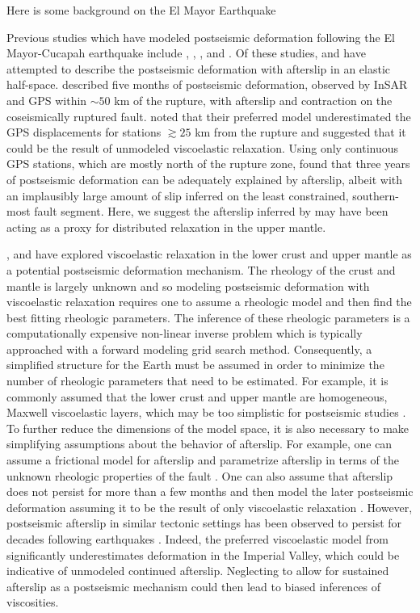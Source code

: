 \documentclass[draft,linenumbers]{AGUJournal}
\begin{document}
Here is some background on the El Mayor Earthquake


Previous studies which have modeled postseismic deformation following the El Mayor-Cucapah earthquake include \citet{Pollitz2012}, \citet{Gonzalez-ortega2014}, \citet{Spinler2015}, and \citet{Rollins2015}. Of these studies, \citet{Gonzalez-ortega2014} and \citet{Rollins2015} have attempted to describe the postseismic deformation with afterslip in an elastic half-space.  \citet{Gonzalez-ortega2014} described five months of postseismic deformation, observed by InSAR and GPS within ${\sim}50$ km of the rupture, with afterslip and contraction on the coseismically ruptured fault. \citet{Gonzalez-ortega2014} noted that their preferred model underestimated the GPS displacements for stations $\gtrsim 25$ km from the rupture and suggested that it could be the result of unmodeled viscoelastic relaxation.  Using only continuous GPS stations, which are mostly north of the rupture zone, \citet{Rollins2015} found that three years of postseismic deformation can be adequately explained by afterslip, albeit with an implausibly large amount of slip inferred on the least constrained, southern-most fault segment. Here, we suggest the afterslip inferred by \citet{Rollins2015} may have been acting as a proxy for distributed relaxation in the upper mantle. 

\citet{Pollitz2012}, \citet{Rollins2015} and \citet{Spinler2015} have explored viscoelastic relaxation in the lower crust and upper mantle as a potential postseismic deformation mechanism. The rheology of the crust and mantle is largely unknown and so modeling postseismic deformation with viscoelastic relaxation requires one to assume a rheologic model and then find the best fitting rheologic parameters.  The inference of these rheologic parameters is a computationally expensive non-linear inverse problem which is typically approached with a forward modeling grid search method.  Consequently, a simplified structure for the Earth must be assumed in order to minimize the number of rheologic parameters that need to be estimated.  For example, it is commonly assumed that the lower crust and upper mantle are homogeneous, Maxwell viscoelastic layers, which may be too simplistic for postseismic studies  \citep{Riva2009,Hines2013}. To further reduce the dimensions of the model space, it is also necessary to make simplifying assumptions about the behavior of afterslip. For example, one can assume a frictional model for afterslip and parametrize afterslip in terms of the unknown rheologic properties of the fault \citep[e.g.][]{Johnson2009,Johnson2004}. One can also assume that afterslip does not persist for more than a few months and then model the later postseismic deformation assuming it to be the result of only viscoelastic relaxation \citep[e.g.][]{Pollitz2012,Spinler2015}. However, postseismic afterslip in similar tectonic settings has been observed to persist for decades following earthquakes \citep{Cakir2012,Cetin2014}. Indeed, the preferred viscoelastic model from \citet{Pollitz2012} significantly underestimates deformation in the Imperial Valley, which could be indicative of unmodeled continued afterslip.  Neglecting to allow for sustained afterslip as a postseismic mechanism could then lead to biased inferences of viscosities. 
\end{document}
